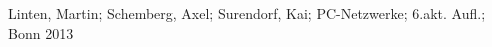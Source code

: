 \begin{thebibliography}{9999} %
 Linten, Martin; Schemberg, Axel; Surendorf, Kai; PC-Netzwerke; 6.akt. Aufl.; Bonn 2013

\end{thebibliography}
